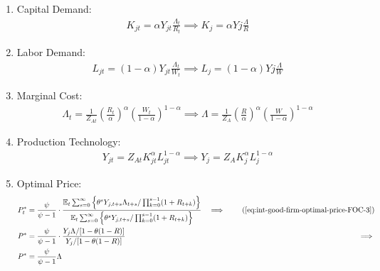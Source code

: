 \documentclass[
	12pt,
	]{article}
\numberwithin{equation}{section}
\newcommand{\E}[1][t]{{\mathbb{E}_{#1}}}
\theoremstyle{definition}
\theoremstyle{plain}
\theoremstyle{plain}
\theoremstyle{plain}
\begin{document}
\begin{enumerate}
	\item Capital Demand:
	\begin{align}
	\label{eq:ss-int-good-firm-FOC-Kt}
		K_{jt} = \alpha Y_{jt} \frac{\Lambda_t}{R_t} \implies 
		K_{j} = \alpha Y{j} \frac{\Lambda}{R}
	\end{align}
		
	\item Labor Demand:
	\begin{align}
	\label{eq:ss-int-good-firm-FOC-Lt}
		L_{jt} = (1-\alpha) Y_{jt} \frac{\Lambda_t}{W_t} \implies 
		L_{j} = (1-\alpha) Y{j} \frac{\Lambda}{W}
	\end{align}
	
	
	\item Marginal Cost:
	\begin{align}
	\label{eq:ss-int-good-firm-MC-2}
		\Lambda_t = \frac{1}{Z_{At}} \left( \frac{R_t}{\alpha} \right)^{\alpha} \left( \frac{W_t}{1-\alpha} \right)^{1-\alpha} \implies
		\Lambda = \frac{1}{Z_{A}} \left( \frac{R}{\alpha} \right)^{\alpha} \left( \frac{W}{1-\alpha} \right)^{1-\alpha}
	\end{align}
		
	\item Production Technology:
	\begin{align}
	\label{eq:ss-int-good-firm-production-function}
		Y_{jt} = Z_{At} K_{jt}^\alpha L_{jt}^{1-\alpha} \implies 
		Y_{j} = Z_{A} K_{j}^\alpha L_{j}^{1-\alpha}
	\end{align}
		
	\item Optimal Price:
	\begin{alignat}{2}
	P_t^\ast &= \frac{\psi}{\psi-1} \cdot \frac{\E \sum_{s=0}^{\infty} \left\{\theta^s Y_{j,t+s} \Lambda_{t+s} / \prod_{k=0}^{s-1}(1+R_{t+k}) \right\}} {\E \sum_{s=0}^{\infty} \left\{ \theta^s Y_{j,t+s} / \prod_{k=0}^{s-1}(1+R_{t+k}) \right\}} &\implies \tag{\ref{eq:int-good-firm-optimal-price-FOC-3}} \\
	P^\ast &= \frac{\psi}{\psi-1} \cdot \frac{ Y_j \Lambda / [1-\theta(1-R)]} {Y_j / [1-\theta(1-R)]} &\implies \nonumber \\
	P^\ast &= \frac{\psi}{\psi-1} \Lambda \label{eq:ss-int-good-firm-optimal-price-FOC-3}
	\end{alignat}
	

\end{enumerate}
\end{document}

